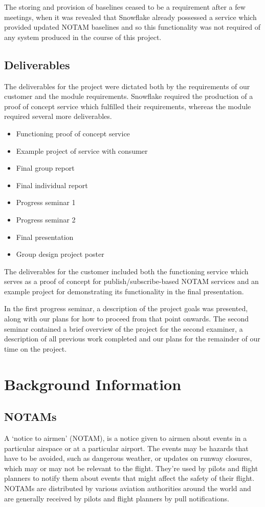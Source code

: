 \documentclass[a4paper, 12pt, twoside]{article}
\begin{document}
The storing and provision of baselines ceased to be a requirement after a few meetings, when it was revealed that Snowflake already possessed a service which provided updated NOTAM baselines and so this functionality was not required of any system produced in the course of this project.

\subsection{Deliverables}
\label{sec:plan_deliverables}

The deliverables for the project were dictated both by the requirements of our customer and the module requirements. Snowflake required the production of a proof of concept service which fulfilled their requirements, whereas the module required several more deliverables.

\begin{itemize}
\item Functioning proof of concept service
\item Example project of service with consumer
\item Final group report
\item Final individual report
\item Progress seminar 1
\item Progress seminar 2
\item Final presentation
\item Group design project poster
\end{itemize}

The deliverables for the customer included both the functioning service which serves as a proof of concept for publish/subscribe-based NOTAM services and an example project for demonstrating its functionality in the final presentation.

In the first progress seminar, a description of the project goals was presented, along with our plans for how to proceed from that point onwards. The second seminar contained a brief overview of the project for the second examiner, a description of all previous work completed and our plans for the remainder of our time on the project.

\section{Background Information}

\subsection{NOTAMs}
\label{sec:bg_notams}
A `notice to airmen' (NOTAM), is a notice given to airmen about events in a particular airspace or at a particular airport. The events may be hazards that have to be avoided, such as dangerous weather, or updates on runway closures, which may or may not be relevant to the flight. They're used by pilots and flight planners to notify them about events that might affect the safety of their flight. NOTAMs are distributed by various aviation authorities around the world and are generally received by pilots and flight planners by pull notifications.
\end{document}
